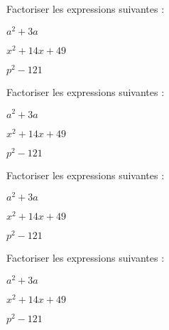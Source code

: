 \documentclass{exos}
\begin{document}
\begin{exercize*}
Factoriser les expressions suivantes :
\begin{alphaquestions}
\item $a^2 + 3a$
\item $x^2 + 14x + 49$
\item $p^2 - 121$
\end{alphaquestions}
\end{exercize*}
\vspace*{2cm}
\begin{exercize*}
Factoriser les expressions suivantes :
\begin{alphaquestions}
\item $a^2 + 3a$
\item $x^2 + 14x + 49$
\item $p^2 - 121$
\end{alphaquestions}
\end{exercize*}
\vspace*{2cm}
\begin{exercize*}
Factoriser les expressions suivantes :
\begin{alphaquestions}
\item $a^2 + 3a$
\item $x^2 + 14x + 49$
\item $p^2 - 121$
\end{alphaquestions}
\end{exercize*}
\vspace*{2cm}
\begin{exercize*}
Factoriser les expressions suivantes :
\begin{alphaquestions}
\item $a^2 + 3a$
\item $x^2 + 14x + 49$
\item $p^2 - 121$
\end{alphaquestions}
\end{exercize*}
\vspace*{2cm}
\end{document}
